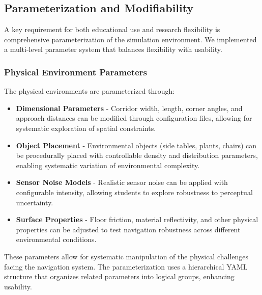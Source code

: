 
\subsection{Parameterization and Modifiability}

A key requirement for both educational use and research flexibility is comprehensive 
parameterization of the simulation environment. We implemented a multi-level parameter 
system that balances flexibility with usability.

\subsubsection{Physical Environment Parameters}
The physical environments are parameterized through:
\begin{itemize}
    \item \textbf{Dimensional Parameters} - Corridor width, length, corner angles, 
    and approach distances can be modified through configuration files, allowing for 
    systematic exploration of spatial constraints.
    \item \textbf{Object Placement} - Environmental objects (side tables, plants, chairs) 
    can be procedurally placed with controllable density and distribution parameters, 
    enabling systematic variation of environmental complexity.
    \item \textbf{Sensor Noise Models} - Realistic sensor noise can be applied with 
    configurable intensity, allowing students to explore robustness to perceptual 
    uncertainty.
    \item \textbf{Surface Properties} - Floor friction, material reflectivity, and 
    other physical properties can be adjusted to test navigation robustness across 
    different environmental conditions.
\end{itemize}
These parameters allow for systematic manipulation of the physical challenges facing 
the navigation system. The parameterization uses a hierarchical YAML structure that 
organizes related parameters into logical groups, enhancing usability.

